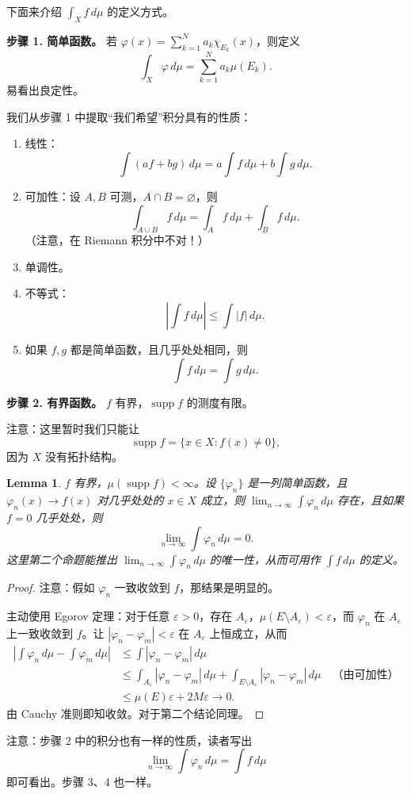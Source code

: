 \documentclass[12pt,letterpaper,twoside,openright]{ctexbook}
\theoremstyle{bluehead}
\newtheorem{lemma}[theorem]{Lemma}
\theoremstyle{olivehead}
\theoremstyle{orangehead}
\theoremstyle{redremark}
\begin{document}
下面来介绍 $\int_X f\,d\mu$ 的定义方式。

\textbf{步骤 1. 简单函数。} 若 $\varphi(x)=\sum_{k=1}^{N}a_k\chi_{E_k}(x)$，则定义
\[
  \int_X\varphi\,d\mu=\sum_{k=1}^{N}a_k\mu(E_k).
\]
易看出良定性。

我们从步骤 1 中提取“我们希望”积分具有的性质：
\begin{enumerate}
  \item[(1)] 线性：
  \[
    \int(af+bg)\,d\mu=a\int f\,d\mu+b\int g\,d\mu.
  \]
  \item[(2)] 可加性：设 $A,B$ 可测，$A\cap B=\varnothing$，则
  \[
    \int_{A\cup B}f\,d\mu=\int_A f\,d\mu+\int_B f\,d\mu.
  \]
  （注意，在 Riemann 积分中不对！）
  \item[(3)] 单调性。
  \item[(4)] 不等式：
  \[
    \left|\int f\,d\mu\right|\leq\int|f|\,d\mu.
  \]
  \item[(5)] 如果 $f,g$ 都是简单函数，且几乎处处相同，则
  \[
    \int f\,d\mu=\int g\,d\mu.
  \]
\end{enumerate}

\textbf{步骤 2. 有界函数。} $f$ 有界，$\operatorname{supp}f$ 的测度有限。

注意：这里暂时我们只能让
\[
  \operatorname{supp}f=\{x\in X:f(x)\ne0\},
\]
因为 $X$ 没有拓扑结构。

\begin{lemma}
$f$ 有界，$\mu(\operatorname{supp}f)<\infty$。设 $\{\varphi_n\}$ 是一列简单函数，且 $\varphi_n(x)\to f(x)$ 对几乎处处的 $x\in X$ 成立，则 $\lim_{n\to\infty}\int\varphi_n\,d\mu$ 存在，且如果 $f=0$ 几乎处处，则
\[
  \lim_{n\to\infty}\int\varphi_n\,d\mu=0.
\]
这里第二个命题能推出 $\lim_{n\to\infty}\int\varphi_n\,d\mu$ 的唯一性，从而可用作 $\int f\,d\mu$ 的定义。
\end{lemma}

\begin{proof}
注意：假如 $\varphi_n$ 一致收敛到 $f$，那结果是明显的。

主动使用 Egorov 定理：对于任意 $\varepsilon>0$，存在 $A_\varepsilon$，$\mu(E\setminus A_\varepsilon)<\varepsilon$，而 $\varphi_n$ 在 $A_\varepsilon$ 上一致收敛到 $f$。让 $|\varphi_n-\varphi_m|<\varepsilon$ 在 $A_\varepsilon$ 上恒成立，从而
\[
\begin{aligned}
  \left|\int\varphi_n\,d\mu-\int\varphi_m\,d\mu\right|
  &\leq\int|\varphi_n-\varphi_m|\,d\mu\\
  &\leq\int_{A_\varepsilon}|\varphi_n-\varphi_m|\,d\mu
    +\int_{E\setminus A_\varepsilon}|\varphi_n-\varphi_m|\,d\mu
    \quad\text{（由可加性）}\\
  &\leq\mu(E)\varepsilon+2M\varepsilon\longrightarrow0.
\end{aligned}
\]
由 Cauchy 准则即知收敛。对于第二个结论同理。
\end{proof}
注意：步骤 2 中的积分也有一样的性质，读者写出
\[
  \lim_{n\to\infty}\int\varphi_n\,d\mu=\int f\,d\mu
\]
即可看出。步骤 3、4 也一样。
\end{document}

